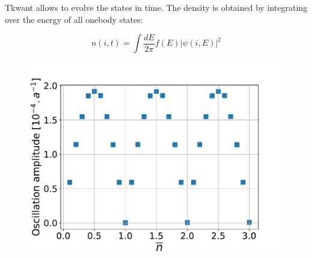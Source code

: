 Tkwant allows to evolve the states in time. The density is obtained by integrating over the energy of all onebody states:

\begin{equation}
n(i,t) = \int \frac{dE}{2\pi} f(E) |\psi(i,E)|^2
\end{equation}
\begin{figure}
	\centering
	\includegraphics[width=0.7\linewidth]{../figures/A_vs_nbar_W1_L3000_V03_lx50_Ef21_u0_tau500}
	\caption{}
	\label{fig:avsnbarw1l3000v03lx50ef2}
\end{figure}
